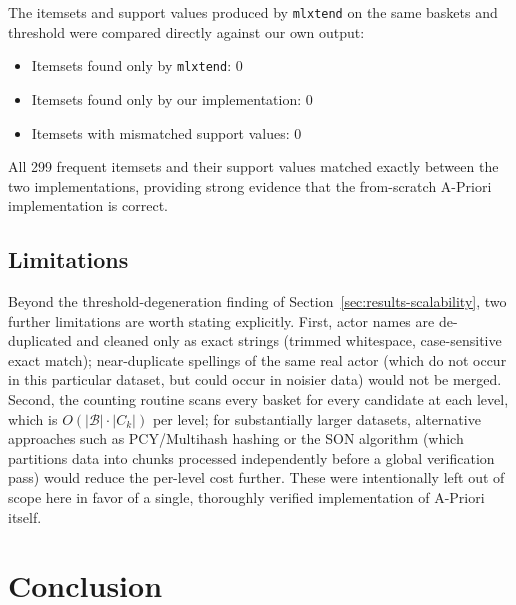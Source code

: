 \documentclass[11pt,a4paper]{article}
\begin{document}
The itemsets and support values produced by \texttt{mlxtend} on the same
baskets and threshold were compared directly against our own output:
\begin{itemize}
    \item Itemsets found only by \texttt{mlxtend}: 0
    \item Itemsets found only by our implementation: 0
    \item Itemsets with mismatched support values: 0
\end{itemize}
All 299 frequent itemsets and their support values matched exactly between
the two implementations, providing strong evidence that the from-scratch
A-Priori implementation is correct.

\subsection{Limitations}
\label{sec:limitations}

Beyond the threshold-degeneration finding of Section~\ref{sec:results-scalability},
two further limitations are worth stating explicitly. First, actor names are
de-duplicated and cleaned only as exact strings (trimmed whitespace,
case-sensitive exact match); near-duplicate spellings of the same real actor
(which do not occur in this particular dataset, but could occur in noisier
data) would not be merged. Second, the counting routine scans every basket for
every candidate at each level, which is $O(|\mathcal{B}| \cdot |C_k|)$ per
level; for substantially larger datasets, alternative approaches such as
PCY/Multihash hashing or the SON algorithm (which partitions data into chunks
processed independently before a global verification pass) would reduce the
per-level cost further. These were intentionally left out of scope here in
favor of a single, thoroughly verified implementation of A-Priori itself.

\section{Conclusion}
\label{sec:conclusion}
\end{document}
